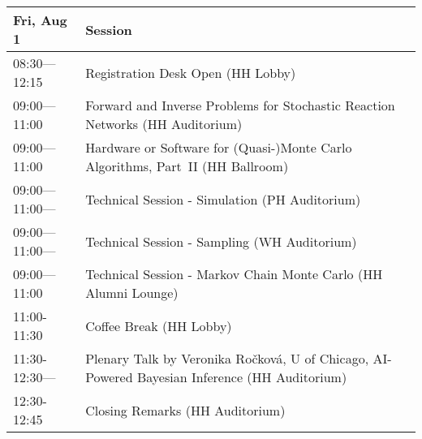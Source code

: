 \begin{table}
{\footnotesize
\begin{tabularx}{\textwidth}{>{\hsize=0.32\hsize}X|>{\hsize=1.7\hsize}X}
\hline
\textbf{Fri, Aug 1} & \textbf{Session} \\
\hline
\cellcolor{\EmptyColor}08:30---12:15 & \cellcolor{\EmptyColor}Registration Desk Open (HH Lobby) \\
\cellcolor{\SessionTitleColor}09:00---11:00 & \cellcolor{\SessionTitleColor}Forward and Inverse Problems for Stochastic Reaction Networks (HH Auditorium) \\
\cellcolor{\SessionTitleColor}09:00---11:00 & \cellcolor{\SessionTitleColor}Hardware or Software for (Quasi-)Monte Carlo Algorithms, Part~II (HH Ballroom) \\
\cellcolor{\SessionLightColor}09:00---11:00— & \cellcolor{\SessionLightColor}Technical Session - Simulation (PH Auditorium) \\
\cellcolor{\SessionLightColor}09:00---11:00— & \cellcolor{\SessionLightColor}Technical Session - Sampling (WH Auditorium) \\
\cellcolor{\SessionLightColor}09:00---11:00 & \cellcolor{\SessionLightColor}Technical Session - Markov Chain Monte Carlo (HH Alumni Lounge) \\
\cellcolor{\EmptyColor}11:00-11:30 & \cellcolor{\EmptyColor}Coffee Break (HH Lobby) \\
\cellcolor{\PlenaryColor}11:30-12:30— & \cellcolor{\PlenaryColor}Plenary Talk by Veronika Ro\v{c}kov\'a, U of Chicago, AI-Powered Bayesian Inference (HH Auditorium) \\
\cellcolor{\PlenaryColor}12:30-12:45 & \cellcolor{\PlenaryColor}Closing Remarks (HH Auditorium) \\
\hline
\end{tabularx}
}
\end{table}

